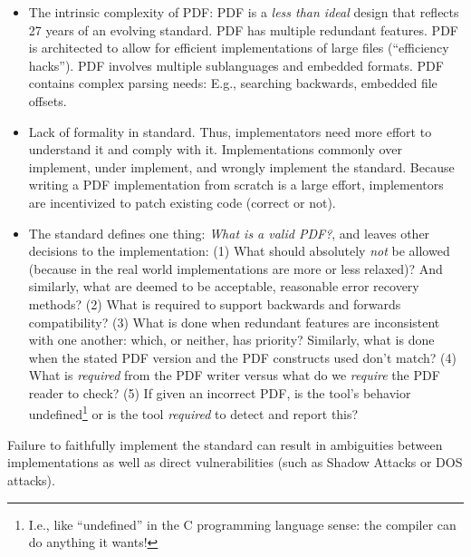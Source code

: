 \begin{itemize}
\item The intrinsic complexity of PDF:
  PDF is a \emph{less than ideal} design that reflects 27 years of
  an evolving standard.
  PDF has multiple redundant features.
  PDF is architected to allow for efficient implementations of
  large files (``efficiency hacks'').
  PDF involves multiple sublanguages and embedded formats.
  PDF contains complex parsing needs:
  E.g., searching backwards, embedded file offsets.
\item Lack of formality in standard. Thus, implementators
  need more effort to understand it and comply with it.
  Implementations commonly over implement, under implement,
  and wrongly implement the standard.
  Because writing a PDF implementation from scratch is a large effort,
  implementors are incentivized to patch existing code (correct or not).
\item The standard defines one thing: \emph{What is a valid PDF?},
  and leaves other decisions to the implementation:
  (1) What should absolutely \emph{not} be allowed (because in the real world
    implementations are more or less relaxed)? And similarly,
    what are deemed to be acceptable, reasonable error recovery methods?
  (2) What is required to support backwards and forwards compatibility?
  (3) What is done when redundant features are inconsistent with one
    another: which, or neither, has priority?
    Similarly, what is done when the stated PDF version and the PDF
    constructs used don't match?
  (4) What is \emph{required} from the PDF writer versus
    what do we \emph{require} the PDF reader to check?
  (5) If given an incorrect PDF, is the tool's behavior undefined\footnote{
      I.e., like ``undefined'' in the C programming language sense: the
      compiler can do anything it wants!
    } or is the tool \emph{required} to detect and report this?
\end{itemize}
Failure to faithfully implement the standard can result in ambiguities
between implementations as well as direct vulnerabilities (such as
Shadow Attacks or DOS attacks).


